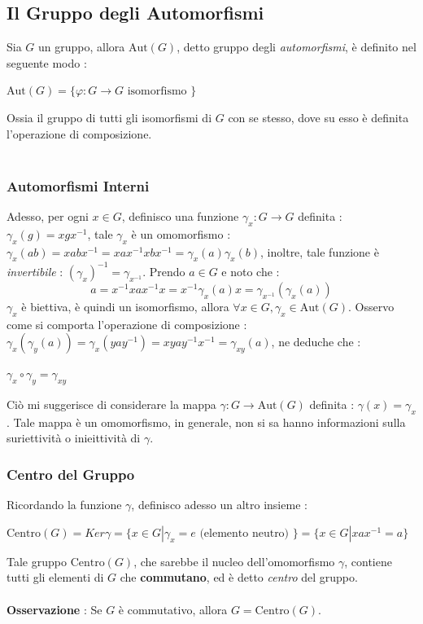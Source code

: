 \documentclass[12pt, letterpaper]{article}
\newcommand{\aut}{{\text{Aut}}}
\newcommand{\cen}{{\text{Centro}}}
\begin{document}
\subsection{Il Gruppo degli Automorfismi} \label{automorfismi}
Sia \(G\) un gruppo, allora \(\aut(G)\), detto gruppo degli \textit{automorfismi}, è definito nel seguente modo :
\begin{center}\( \aut(G)=\{\varphi : G\rightarrow G \text{ isomorfismo }\} \)\end{center}
Ossia il gruppo di tutti gli isomorfismi di \(G\) con se stesso, dove su esso è definita l'operazione di 
composizione.\\\hphantom{}\\
\subsubsection{Automorfismi Interni}
Adesso, per ogni \(x\in G\), definisco una funzione \(\gamma_x : G\rightarrow G\) definita : \(\gamma_x(g)=xgx^{-1}\), 
tale \(\gamma_x\) è un omomorfismo : \(\gamma_x(ab)=xabx^{-1}=xax^{-1}xbx^{-1}=\gamma_x(a)\gamma_x(b)\), inoltre, tale funzione 
è \textit{invertibile} : \((\gamma_x)^{-1}=\gamma_{x^{-1}}\). Prendo \(a\in G\) e noto che : \begin{equation}
a=x^{-1}xax^{-1}x=x^{-1}\gamma_x(a)x=\gamma_{x^{-1}}(\gamma_x(a))
\end{equation}
\(\gamma_x\) è biettiva, è quindi un isomorfismo, allora \(\forall x\in G, \gamma_x \in \aut(G)\). Osservo 
come si comporta l'operazione di composizione : \(\gamma_x(\gamma_y(a))=\gamma_x(yay^{-1})=xyay^{-1}x^{-1}=\gamma_{xy}(a)\), ne deduche che :
\begin{center}
    \(\gamma_x\circ \gamma_y = \gamma_{xy}\)
\end{center}
Ciò mi suggerisce di considerare la mappa \(\gamma : G\rightarrow \aut(G)\) definita : \(\gamma(x)=\gamma_x\). Tale 
mappa è un omomorfismo, in generale, non si sa hanno informazioni sulla suriettività o inieittività di \(\gamma\). 
\subsubsection{Centro del Gruppo}
Ricordando la funzione \(\gamma\), definisco adesso un altro insieme :\begin{center}
    \(
    \cen(G)=Ker\gamma = \{x\in G|\gamma_x = e \text{ (elemento neutro) }\}=\{x\in G|xax^{-1}=a\}    
    \)
\end{center}
Tale gruppo \(\cen(G)\), che sarebbe il nucleo dell'omomorfismo \(\gamma\),
contiene tutti gli elementi di \(G\) che \textbf{commutano}, ed è detto \textit{centro} del 
gruppo.\\\hphantom{}\\        
\textbf{Osservazione }: Se \(G\) è commutativo, allora \(G=\cen(G)\).
\end{document}
